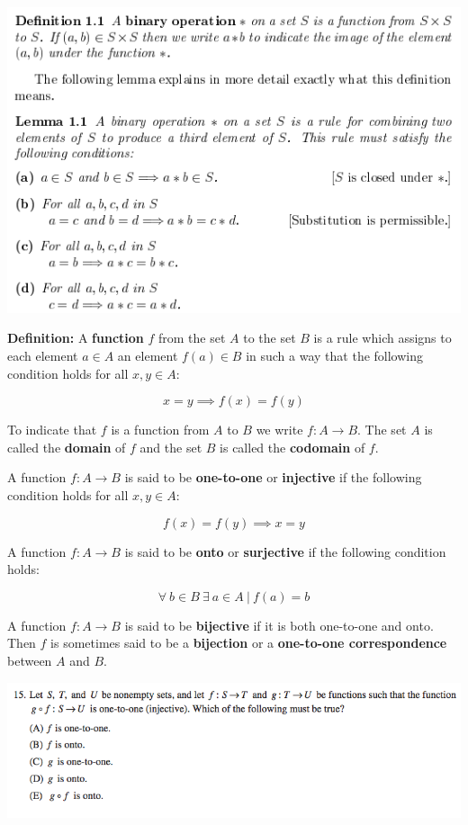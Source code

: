 \documentclass{article}
\begin{document}
\includegraphics[scale=0.65]{binary_operation}


\textbf{Definition:} A \textbf{function} \(f\) from the set \(A\) to the set \(B\) is a rule which assigns to each element \(a \in A\) an element \(f(a) \in B\) in such a way that the following condition holds for all \(x, y \in A\):

\[
x = y \implies f(x) = f(y)
\]

To indicate that \(f\) is a function from \(A\) to \(B\) we write \(f: A \to B\). The set \(A\) is called the \textbf{domain} of \(f\) and the set \(B\) is called the \textbf{codomain} of \(f\).


A function \(f: A \to B\) is said to be \textbf{one-to-one} or \textbf{injective} if the following condition holds for all \(x, y \in A\):

\[
f(x) = f(y) \implies x = y
\]

A function \(f: A \to B\) is said to be \textbf{onto} or \textbf{surjective} if the following condition holds:

\[
\forall \ b \in B \ \exists \ a \in A \ | \ f(a) = b
\]

A function \(f: A \to B\) is said to be \textbf{bijective} if it is both one-to-one and onto. Then \(f\) is sometimes said to be a \textbf{bijection} or a \textbf{one-to-one correspondence} between \(A\) and \(B\).

\includegraphics[scale=0.65]{1268_15}
\end{document}
